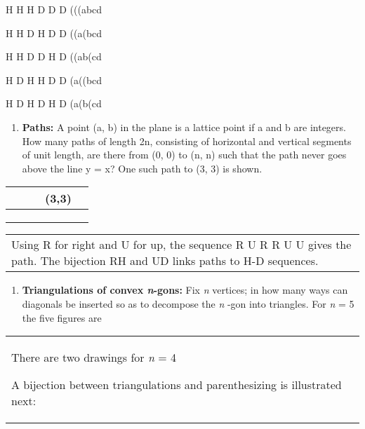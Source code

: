 \documentclass[10pt,letter]{article}
\renewenvironment{quote}
  {\begin{tabular}{|p{13cm}}}
  {\end{tabular}}
\begin{document}
H H H D D D  (((abcd

H H D H D D  ((a(bcd

H H D D H D  ((ab(cd

H D H H D D  (a((bcd

H D H D H D (a(b(cd

\begin{enumerate}
\def\labelenumi{\Roman{enumi}.}

\item
  \textbf{Paths:} A point (a, b) in the plane is a lattice point if a
  and b are integers. How many paths of length 2n, consisting of
  horizontal and vertical segments of unit length, are there from (0, 0)
  to (n, n) such that the path never goes above the line y = x? One such
  path to (3, 3) is shown.

\end{enumerate}

\begin{longtable}[]{@{}lllll@{}}
\toprule
& & & (3,3) &\tabularnewline
\midrule
\endhead
& & & &\tabularnewline
& & & &\tabularnewline
& & & &\tabularnewline
\bottomrule

\end{longtable}

\begin{quote}
Using R for right and U for up, the sequence R U R R U U gives the path.
The bijection R\selectlanguage{english}H and U\selectlanguage{english}D links paths to H-D sequences.

\end{quote}

\begin{enumerate}
\def\labelenumi{\Roman{enumi}.}

\item
  \textbf{Triangulations of convex \emph{n}-gons:} Fix \emph{n} 
  vertices; in how many ways can diagonals be inserted so as to
  decompose the \emph{n} -gon into triangles. For \emph{n} = 5 the five
  figures are

\end{enumerate}

\begin{quote}
There are two drawings for \emph{n} = 4

A bijection between triangulations and parenthesizing is illustrated
next:

\end{quote}
\end{document}
